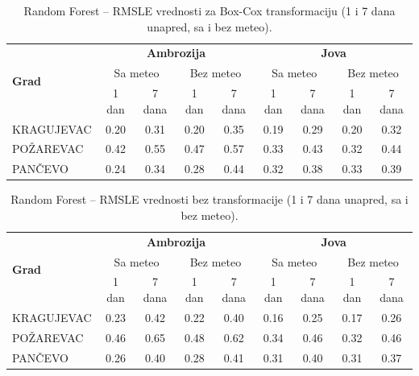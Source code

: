 \documentclass[12pt]{article}
\begin{document}
\begin{table}[h!]
\centering
\caption{Random Forest – RMSLE vrednosti za Box-Cox transformaciju (1 i 7 dana unapred, sa i bez meteo).}
\label{tab:rf_rmsle_boxcox}
\begin{tabular}{|l|c|c|c|c||c|c|c|c|}
\hline
\multirow{3}{*}{\textbf{Grad}} 
& \multicolumn{4}{c||}{\textbf{Ambrozija}} 
& \multicolumn{4}{c|}{\textbf{Jova}} \\ \cline{2-9}
& \multicolumn{2}{c|}{Sa meteo} & \multicolumn{2}{c||}{Bez meteo} 
& \multicolumn{2}{c|}{Sa meteo} & \multicolumn{2}{c|}{Bez meteo} \\ \cline{2-9}
& 1 dan & 7 dana & 1 dan & 7 dana & 1 dan & 7 dana & 1 dan & 7 dana \\ \hline
KRAGUJEVAC & 0.20 & 0.31 & 0.20 & 0.35 & 0.19 & 0.29 & 0.20 & 0.32 \\ \hline
POŽAREVAC  & 0.42 & 0.55 & 0.47 & 0.57 & 0.33 & 0.43 & 0.32 & 0.44 \\ \hline
PANČEVO    & 0.24 & 0.34 & 0.28 & 0.44 & 0.32 & 0.38 & 0.33 & 0.39 \\ \hline
\end{tabular}
\end{table}

\begin{table}[h!]
\centering
\caption{Random Forest – RMSLE vrednosti bez transformacije (1 i 7 dana unapred, sa i bez meteo).}
\label{tab:rf_rmsle_none}
\begin{tabular}{|l|c|c|c|c||c|c|c|c|}
\hline
\multirow{3}{*}{\textbf{Grad}} 
& \multicolumn{4}{c||}{\textbf{Ambrozija}} 
& \multicolumn{4}{c|}{\textbf{Jova}} \\ \cline{2-9}
& \multicolumn{2}{c|}{Sa meteo} & \multicolumn{2}{c||}{Bez meteo} 
& \multicolumn{2}{c|}{Sa meteo} & \multicolumn{2}{c|}{Bez meteo} \\ \cline{2-9}
& 1 dan & 7 dana & 1 dan & 7 dana & 1 dan & 7 dana & 1 dan & 7 dana \\ \hline
KRAGUJEVAC & 0.23 & 0.42 & 0.22 & 0.40 & 0.16 & 0.25 & 0.17 & 0.26 \\ \hline
POŽAREVAC  & 0.46 & 0.65 & 0.48 & 0.62 & 0.34 & 0.46 & 0.32 & 0.46 \\ \hline
PANČEVO    & 0.26 & 0.40 & 0.28 & 0.41 & 0.31 & 0.40 & 0.31 & 0.37 \\ \hline
\end{tabular}
\end{table}
\end{document}
